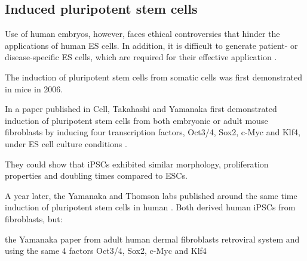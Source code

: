 

\subsection{Induced pluripotent stem cells}

Use of human embryos, however, faces ethical controversies that hinder the applications of human ES cells. In addition, it is difficult to generate patient- or disease-specific ES cells, which are required for their effective application \cite{yamanaka2007strategies}.

The induction of pluripotent stem cells from somatic cells was first demonstrated in mice in 2006.

In a paper published in Cell, Takahashi and Yamanaka first demonstrated induction of pluripotent stem cells from both embryonic or adult mouse fibroblasts by inducing four transcription factors, Oct3/4, Sox2, c-Myc and Klf4, under ES cell culture conditions
\cite{takahashi2006induction}.

They could show that iPSCs exhibited similar morphology, proliferation properties and doubling times compared to ESCs.




A year later, the Yamanaka and Thomson labs published around the same time induction of pluripotent stem cells in human \cite{takahashi2007induction}.
Both derived human iPSCs from fibroblasts, but:

the Yamanaka paper from adult human dermal fibroblasts 
retroviral system and using the same 4 factors Oct3/4, Sox2, c-Myc and Klf4

